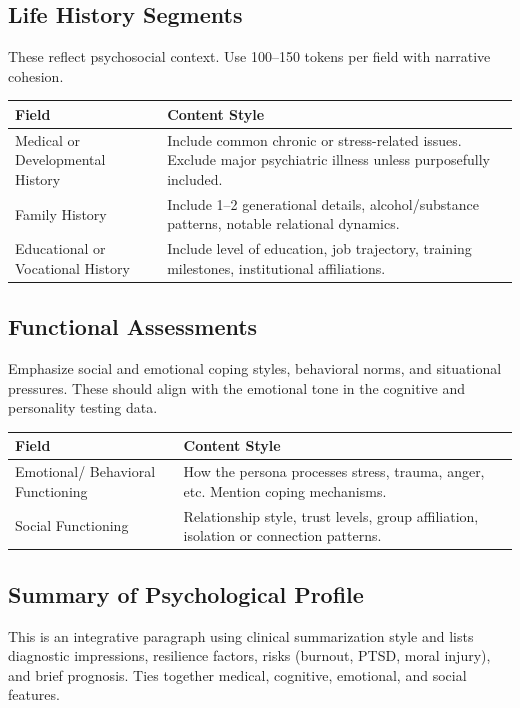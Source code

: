 \documentclass[11pt]{article}
\begin{document}
\subsection*{Life History Segments}
\noindent These reflect psychosocial context. Use 100--150 tokens per field with narrative cohesion.

\vspace{0.15cm}
{\small
\begin{tabular}{|p{7cm}|p{9cm}|}
\hline
\textbf{Field} & \textbf{Content Style} \\
\hline
Medical or Developmental History & Include common chronic or stress-related issues. Exclude major psychiatric illness unless purposefully included. \\
\hline
Family History & Include 1--2 generational details, alcohol/substance patterns, notable relational dynamics. \\
\hline
Educational or  Vocational History & Include level of education, job trajectory, training milestones, institutional affiliations. \\
\hline
\end{tabular}
}

\subsection*{Functional Assessments}
\noindent Emphasize social and emotional coping styles, behavioral norms, and situational pressures. These should align with the emotional tone in the cognitive and personality testing data.

\vspace{0.15cm}
{\small
\begin{tabular}{|p{7cm}|p{9cm}|}
\hline
\textbf{Field} & \textbf{Content Style} \\
\hline
Emotional/ Behavioral Functioning & How the persona processes stress, trauma, anger, etc. Mention coping mechanisms. \\
\hline
Social Functioning & Relationship style, trust levels, group affiliation, isolation or connection patterns. \\
\hline
\end{tabular}
}

\subsection*{Summary of Psychological Profile}
This is an integrative paragraph using clinical summarization style and lists diagnostic impressions, resilience factors, risks (burnout, PTSD, moral injury), and brief prognosis. Ties together medical, cognitive, emotional, and social features. 
\end{document}

